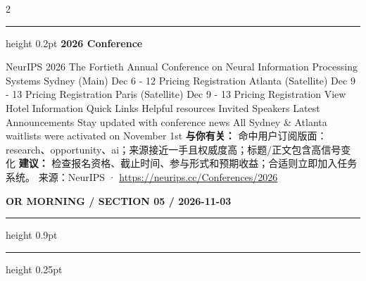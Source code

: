\documentclass[10.5pt]{ctexart}
\begin{document}
\begin{multicols}{2}
\vspace{2mm}
\hrule height 0.2pt
\vspace{2mm}
{\large\bfseries 2026 Conference}\par
NeurIPS 2026 The Fortieth Annual Conference on Neural Information Processing Systems Sydney (Main) Dec 6 - 12 Pricing Registration Atlanta (Satellite) Dec 9 - 13 Pricing Registration Paris (Satellite) Dec 9 - 13 Pricing Registration View Hotel Information Quick Links Helpful resources Invited Speakers Latest Announcements Stay updated with conference news All Sydney \& Atlanta waitlists were activated on November 1st 
\textbf{与你有关：} 命中用户订阅版面：research、opportunity、ai；来源接近一手且权威度高；标题/正文包含高信号变化
\textbf{建议：} 检查报名资格、截止时间、参与形式和预期收益；合适则立即加入任务系统。
{\footnotesize\color{ormuted} 来源：NeurIPS · \url{https://neurips.cc/Conferences/2026}}
\end{multicols}
\newpage
{\small\bfseries OR MORNING / SECTION 05 / 2026-11-03}
\vspace{2mm}
\hrule height 0.9pt
\vspace{1.5mm}
\hrule height 0.25pt
\vspace{4mm}
\end{document}
